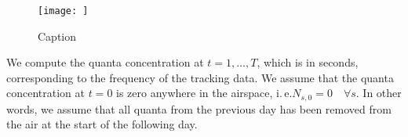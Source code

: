 \documentclass[fleqn,11pt]{wlscirep_supp}
\newcommand\ie{i.\,e.\xspace}
\begin{document}
\begin{figure}
    \centering
    \texttt{[image: ]}
    \caption{Caption}
    \label{fig:clinic}
\end{figure}

We compute the quanta concentration at $t = 1, \dots, T$, which is in seconds, corresponding to the frequency of the tracking data. We assume that the quanta concentration at $t=0$ is zero anywhere in the airspace, \ie $N_{s,0} = 0 \quad \forall s$. In other words, we assume that all quanta from the previous day has been removed from the air at the start of the following day. 

\clearpage


\end{document}
